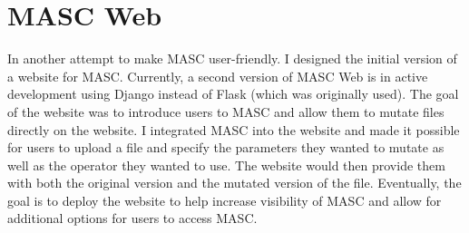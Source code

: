 \section{MASC Web}
\label{ch3:subsec:web}

In another attempt to make MASC user-friendly. I designed the initial version of a website for MASC. Currently, a second version of MASC Web is in active development using Django instead of Flask (which was originally used). The goal of the website was to introduce users to MASC and allow them to mutate files directly on the website. I integrated MASC into the website and made it possible for users to upload a file and specify the parameters they wanted to mutate as well as the operator they wanted to use. The website would then provide them with both the original version and the mutated version of the file. Eventually, the goal is to deploy the website to help increase visibility of MASC and allow for additional options for users to access MASC.

